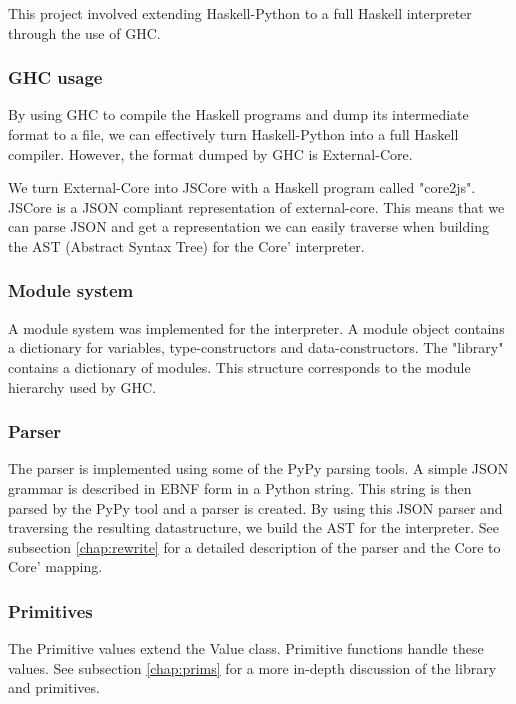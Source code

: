 This project involved extending Haskell-Python to a full Haskell interpreter 
through the use of GHC.

\subsubsection{GHC usage}


By using GHC to compile the Haskell programs and dump its intermediate
format to a file, we can effectively turn Haskell-Python into a full
Haskell compiler. However, the format dumped by GHC is External-Core.

We turn External-Core into JSCore with a Haskell program called "core2js".
JSCore is a JSON compliant representation of external-core. This means that
we can parse JSON and get a representation we can easily traverse when building
the AST (Abstract Syntax Tree) for the Core' interpreter.

\subsubsection{Module system}

A module system was implemented for the interpreter. A module object contains
a dictionary for variables, type-constructors and data-constructors. The 
"library" contains a dictionary of modules. This structure corresponds to the
module hierarchy used by GHC.

\subsubsection{Parser}


The parser is implemented using some of the PyPy parsing tools. A simple 
JSON grammar is described in EBNF form in a Python string. This string
is then parsed by the PyPy tool and a parser is created. By using this JSON
parser and traversing the resulting datastructure, we build the AST for the 
interpreter. See subsection \ref{chap:rewrite} for a detailed description of 
the parser and the Core to Core' mapping.

\subsubsection{Primitives}

The Primitive values extend the Value class. Primitive functions handle
these values.
See subsection \ref{chap:prims} for a more in-depth discussion of the
library and primitives.

